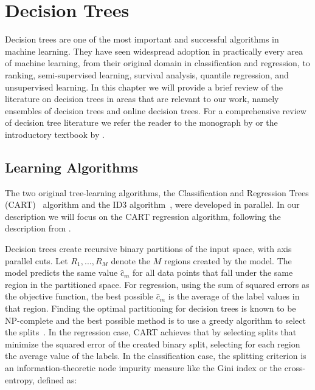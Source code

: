 \chapter{Decision Trees}
\label{ch:bg-decision-trees}

Decision trees are one of the most important and successful algorithms
in machine learning. They have seen widespread adoption in practically
every area of machine learning, from their original domain in classification
and regression, to ranking, semi-supervised learning, survival analysis,
quantile regression, and unsupervised learning. In this chapter
we will provide a brief review of the literature on decision trees in
areas that are relevant to our work, namely ensembles of decision
trees and online decision trees. For a comprehensive review of
decision tree literature we refer the reader to the monograph
by \citet{decision-trees-book} or the introductory textbook by \citet{esl}.

\section{Learning Algorithms}
\label{sec:bg-dt-learning-algorithms}

The two original tree-learning algorithms, the
Classification and Regression Trees (CART)~\cite{breiman1984cart} algorithm and the ID3
algorithm~\cite{id3}, were developed in parallel. In our description we will
focus on the CART regression algorithm, following the description from \cite{esl}.

Decision trees create recursive binary partitions of the input space,
with axis parallel cuts. Let $R_1, ..., R_M$ denote the $M$ regions created by
the model.
The model predicts the same value $\hat{c}_m$ for all data points
that fall under the same region in the partitioned space. For regression,
using the sum of squared errors as the objective function, the best possible
$\hat{c}_m$ is the average of the label values in that region.
Finding the optimal partitioning for decision trees is known to be
NP-complete \cite{dt-np-complete} and the best possible method
is to use a greedy algorithm to select the splits~\cite{dt-hardness}.
In the regression case, CART achieves that by selecting splits
that minimize the squared error of the created binary split, selecting
for each region the average value of the labels.
In the classification case, the splitting criterion is an information-theoretic
node impurity measure like the Gini index or the cross-entropy, defined as:

